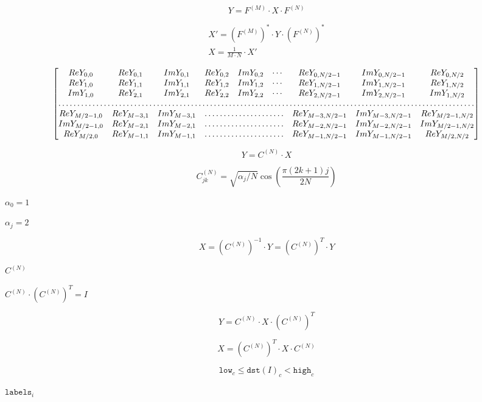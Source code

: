 \documentclass{article}
\begin{document}
\[Y = F^{(M)}  \cdot X  \cdot F^{(N)}\]
\pagebreak

\[\begin{array}{l} X'=  \left (F^{(M)} \right )^*  \cdot Y  \cdot \left (F^{(N)} \right )^* \\ X =  \frac{1}{M \cdot N} \cdot X' \end{array}\]
\pagebreak

\[\begin{bmatrix} Re Y_{0,0} & Re Y_{0,1} & Im Y_{0,1} & Re Y_{0,2} & Im Y_{0,2} &  \cdots & Re Y_{0,N/2-1} & Im Y_{0,N/2-1} & Re Y_{0,N/2}  \\ Re Y_{1,0} & Re Y_{1,1} & Im Y_{1,1} & Re Y_{1,2} & Im Y_{1,2} &  \cdots & Re Y_{1,N/2-1} & Im Y_{1,N/2-1} & Re Y_{1,N/2}  \\ Im Y_{1,0} & Re Y_{2,1} & Im Y_{2,1} & Re Y_{2,2} & Im Y_{2,2} &  \cdots & Re Y_{2,N/2-1} & Im Y_{2,N/2-1} & Im Y_{1,N/2}  \\ \hdotsfor{9} \\ Re Y_{M/2-1,0} &  Re Y_{M-3,1}  & Im Y_{M-3,1} &  \hdotsfor{3} & Re Y_{M-3,N/2-1} & Im Y_{M-3,N/2-1}& Re Y_{M/2-1,N/2}  \\ Im Y_{M/2-1,0} &  Re Y_{M-2,1}  & Im Y_{M-2,1} &  \hdotsfor{3} & Re Y_{M-2,N/2-1} & Im Y_{M-2,N/2-1}& Im Y_{M/2-1,N/2}  \\ Re Y_{M/2,0}  &  Re Y_{M-1,1} &  Im Y_{M-1,1} &  \hdotsfor{3} & Re Y_{M-1,N/2-1} & Im Y_{M-1,N/2-1}& Re Y_{M/2,N/2} \end{bmatrix}\]
\pagebreak

\[Y = C^{(N)}  \cdot X\]
\pagebreak

\[C^{(N)}_{jk}= \sqrt{\alpha_j/N} \cos \left ( \frac{\pi(2k+1)j}{2N} \right )\]
\pagebreak

$\alpha_0=1$
\pagebreak

$\alpha_j=2$
\pagebreak

\[X =  \left (C^{(N)} \right )^{-1}  \cdot Y =  \left (C^{(N)} \right )^T  \cdot Y\]
\pagebreak

$C^{(N)}$
\pagebreak

$C^{(N)} \cdot \left(C^{(N)}\right)^T = I$
\pagebreak

\[Y = C^{(N)}  \cdot X  \cdot \left (C^{(N)} \right )^T\]
\pagebreak

\[X =  \left (C^{(N)} \right )^T  \cdot X  \cdot C^{(N)}\]
\pagebreak

\[\texttt{low} _c  \leq \texttt{dst} (I)_c <  \texttt{high} _c\]
\pagebreak

$\texttt{labels}_i$
\pagebreak
\end{document}
